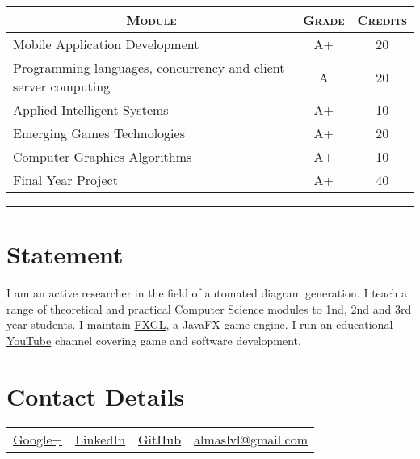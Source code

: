 \documentclass[a4paper,10pt]{article} %
\begin{document}
\begin{center}
\begin{tabular}{lcc}
\multicolumn{1}{c}{\textsc{Module}} & \textsc{Grade}&\textsc{Credits}\\ \hline
Mobile Application Development                                  & A+ & 20\\
Programming languages, concurrency and client server computing  & A & 20\\
Applied Intelligent Systems                                     & A+ & 10\\
Emerging Games Technologies                                     & A+ & 20\\
Computer Graphics Algorithms                                    & A+ & 10\\
Final Year Project                                              & A+ & 40\\
\end{tabular}
\end{center}
\bigskip
\hrule
\vspace{1cm}

\section{Statement}

I am an active researcher in the field of automated diagram generation.
I teach a range of theoretical and practical Computer Science modules to 1nd, 2nd and 3rd year students.
I maintain \href{https://github.com/AlmasB/FXGL}{FXGL}, a JavaFX game engine.
I run an educational \href{https://www.youtube.com/almasb0/videos}{YouTube} channel covering
game and software development.


\section{Contact Details}

\begin{tabular}{c | c | c | c}
\href{https://www.google.com/+AlmasB0}{Google+}
& \href{https://www.linkedin.com/in/AlmasB}{LinkedIn}
& \href{https://github.com/AlmasB}{GitHub}
& \href{mailto:almaslvl@gmail.com}{almaslvl@gmail.com} 


\end{tabular}
\end{document}
